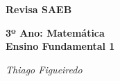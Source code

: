               \vspace*{\fill}
              \begin{center}
              {\HUGE\textbf{Revisa SAEB}}\\
              \bigskip

            {\LARGE\textbf{3º Ano: Matemática}\\
            {\large\textbf{Ensino Fundamental 1}}}\\%

              \bigskip
              \bigskip
              \bigskip

              {\Large\textit{Thiago Figueiredo}

                            }
              \end{center}
              \vspace*{\fill}

\endgroup
\pagebreak
